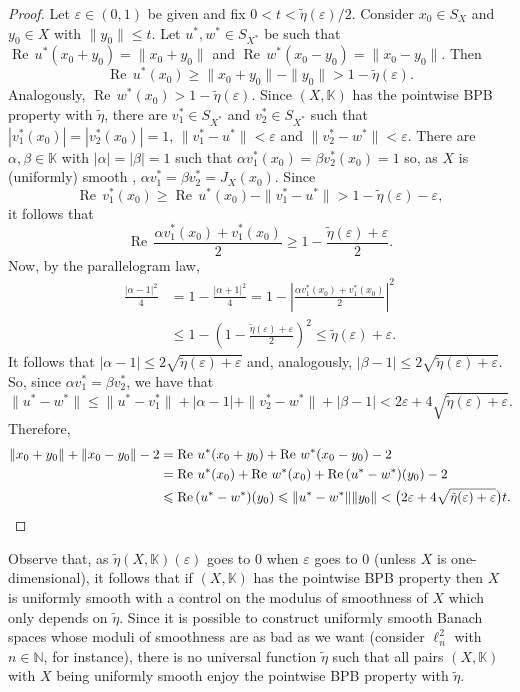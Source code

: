 \documentclass[a4paper,10pt]{amsart}
\theoremstyle{plain}
\theoremstyle{definition}
\DeclareMathOperator{\re}{Re\,}
\newcommand{\K}{\mathbb{K}}
\newcommand{\N}{\mathbb{N}}
\newcommand{\eps}{\varepsilon}
\renewcommand{\geq}{\geqslant}
\renewcommand{\leq}{\leqslant}
\begin{document}
\begin{proof} Let $\eps\in (0,1)$ be given and fix $0<t<\tilde\eta(\eps)/2$. Consider $x_0 \in S_X$ and $y_0\in X$ with $\|y_0\| \leq t$. Let $u^*,w^*\in S_{X^*}$ be such that $\re u^*(x_0 + y_0) = \|x_0 + y_0\|$ and $\re w^*(x_0 - y_0) = \|x_0 - y_0\|$. Then
\begin{equation*}
\re u^*(x_0) \geq \|x_0 + y_0\| - \|y_0\| > 1 - \tilde\eta(\eps).	
\end{equation*}
Analogously, $\re w^*(x_0) > 1 - \tilde\eta(\eps)$. Since $(X, \K)$ has the pointwise BPB property with $\tilde\eta$, there are $v_1^* \in S_{X^*}$ and $v_2^* \in S_{X^*}$ such that $|v_1^*(x_0)| = |v_2^*(x_0)| = 1$, $\|v_1^* - u^*\| < \eps$ and $\|v_2^* - w^*\| < \eps$. There are $\alpha,\beta\in \K$ with $|\alpha|=|\beta|=1$ such that $\alpha v_1^*(x_0)=\beta v_2^*(x_0)=1$ so, as $X$ is (uniformly) smooth \cite[Proposition 2.1]{DKL}, $\alpha v_1^*=\beta v_2^*=J_X(x_0)$. Since
$$
\re v_1^*(x_0) \geq \re u^*(x_0) - \|v_1^*-u^*\| > 1-\tilde\eta(\eps)-\eps,
$$
it follows that
$$
\re \frac{\alpha v_1^*(x_0) + v_1^*(x_0)}{2}\geq 1 - \frac{\tilde\eta(\eps)+\eps}{2}.
$$
Now, by the parallelogram law,
\begin{align*}
\frac{|\alpha-1|^2}{4} &  = 1 - \frac{|\alpha+1|^2}{4}=1 - \left|\frac{\alpha v_1^*(x_0)+ v_1^*(x_0)}{2} \right|^2 \\ & \leq 1 -\left(1-\frac{\tilde\eta(\eps)+\eps}{2}\right)^2 \leq \tilde\eta(\eps)+\eps.
\end{align*}
It follows that $|\alpha-1|\leq 2\sqrt{\tilde\eta(\eps)+\eps}$ and, analogously, $|\beta-1|\leq 2\sqrt{\tilde\eta(\eps)+\eps}$. So, since $\alpha v_1^* = \beta v_2^*$, we have that
\begin{equation*}
\|u^* - w^*\| \leq \|u^* - v_1^*\| + |\alpha-1| + \|v_2^* - w^*\| + |\beta-1| < 2 \eps  + 4 \sqrt{\tilde\eta(\eps)+\eps}.	
\end{equation*}	
Therefore,
\begin{align*}
\|x_0 + y_0\| + \|x_0 - y_0\| - 2 &= \re u^*(x_0 + y_0) + \re w^*	(x_0 - y_0) - 2 \\ &= \re u^*(x_0) + \re w^*(x_0) + \re (u^* - w^*)(y_0) - 2 \\
&\leq \re (u^* - w^*)(y_0) \leq \|u^* - w^*\|\|y_0\| < \bigl(2 \eps  + 4 \sqrt{\tilde\eta(\eps)+\eps}\bigr) t.\qedhere
\end{align*}
\end{proof}

Observe that, as $\tilde\eta(X,\K)(\eps)$ goes to $0$ when $\eps$ goes to $0$ (unless $X$ is one-dimensional), it follows that if $(X,\K)$ has the pointwise BPB property then $X$ is uniformly smooth with a control on the modulus of smoothness of $X$ which only depends on $\tilde\eta$. Since it is possible to construct uniformly smooth  Banach spaces whose  moduli of smoothness are as bad as we want (consider $\ell_n^2$ with $n\in \N$, for instance),  there is no universal function  $\tilde\eta$ such that all pairs $(X,\K)$ with $X$ being uniformly smooth  enjoy  the pointwise BPB property with $\tilde\eta$.
\end{document}
